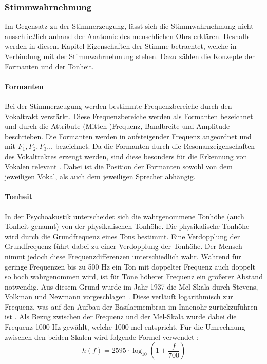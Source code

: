 \subsubsection{Stimmwahrnehmung}
Im Gegensatz zu der Stimmerzeugung, lässt sich die Stimmwahrnehmung nicht ausschließlich anhand der Anatomie des menschlichen Ohrs erklären.
Deshalb werden in diesem Kapitel Eigenschaften der Stimme betrachtet, welche in Verbindung mit der Stimmwahrnehmung stehen.
Dazu zählen die Konzepte der Formanten und der Tonheit.

\paragraph{Formanten}
Bei der Stimmerzeugung werden bestimmte Frequenzbereiche durch den Vokaltrakt verstärkt.
Diese Frequenzbereiche werden als Formanten bezeichnet und durch die Attribute (Mitten-)Frequenz, Bandbreite und Amplitude beschrieben.
Die Formanten werden in aufsteigender Frequenz angeordnet und mit $F_1, F_2, F_3 \dots$ bezeichnet.
Da die Formanten durch die Resonanzeigenschaften des Vokaltraktes erzeugt werden, sind diese besonders für die Erkennung von Vokalen relevant \autocite[vgl.][S. 19-20]{pfister_sprachverarbeitung_2017}.
Dabei ist die Position der Formanten sowohl von dem jeweiligen Vokal, als auch dem jeweiligen Sprecher abhängig.
% 

\paragraph{Tonheit} \label{sec:tonheit}
In der Psychoakustik unterscheidet sich die wahrgenommene Tonhöhe (auch Tonheit genannt) von der physikalischen Tonhöhe.
Die physikalische Tonhöhe wird durch die Grundfrequenz eines Tons bestimmt.
Eine Verdopplung der Grundfrequenz führt dabei zu einer Verdopplung der Tonhöhe.
Der Mensch nimmt jedoch diese Frequenzdifferenzen unterschiedlich wahr.
Während für geringe Frequenzen bis zu 500 Hz ein Ton mit doppelter Frequenz auch doppelt so hoch wahrgenommen wird, ist für Töne höherer Frequenz ein größerer Abstand notwendig.
Aus diesem Grund wurde im Jahr 1937 die Mel-Skala durch Stevens, Volkman und Newmann vorgeschlagen \autocite[vgl.][S. 11]{moser_psychoakustische_2018}.
Diese verläuft logarithmisch zur Frequenz, was auf den Aufbau der Basilarmembran im Innenohr zurückzuführen ist \autocite[vgl.][S. 54]{kroger_neuronale_2018}.
Als Bezug zwischen der Frequenz und der Mel-Skala wurde dabei die Frequenz 1000 Hz gewählt, welche 1000 mel entspricht.
Für die Umrechnung zwischen den beiden Skalen wird folgende Formel verwendet \autocite[vgl.][S. 94-95]{pfister_sprachverarbeitung_2017}:
\begin{equation}
    \label{eq:mel}
    h(f) = 2595 \cdot \log_{10}\left(1 + \frac{f}{700}\right)
\end{equation}

